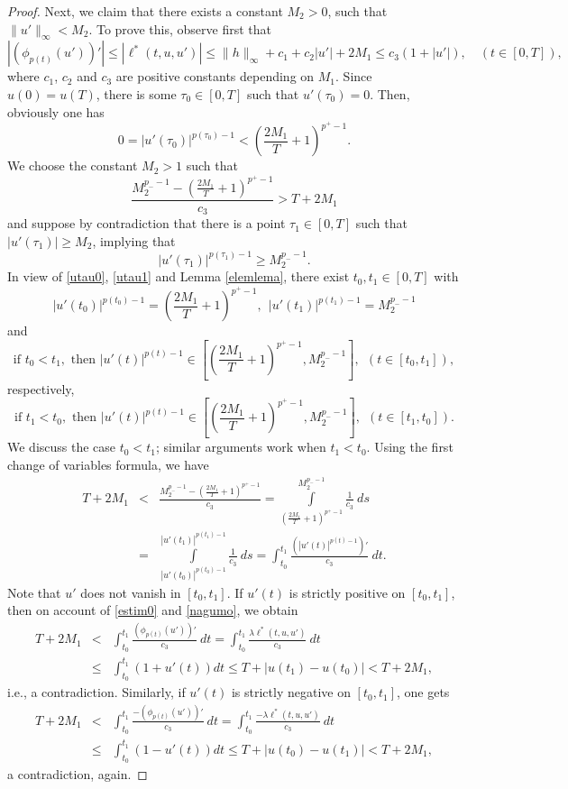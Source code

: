 \documentclass[10pt,a4paper]{amsart}
\begin{document}
\begin{proof}
Next, we claim that there exists a constant $M_2>0$, such that $\|u'\|_\infty<M_2$. To prove this, observe first that
\begin{equation}\label{nagumo}
    |(\phi_{p(t)}(u'))'|\leq|\ell^*(t,u,u')|\leq\|h\|_{\infty}+c_1+c_2|u'|+2M_1\leq c_3(1+|u'|),\quad (t\in[0,T]),
\end{equation}
where $c_1$, $c_2$ and $c_3$ are positive constants depending on $M_1$. Since $u(0)=u(T)$, there is some $\tau_0\in[0,T]$ such that $u'(\tau_0)=0$. Then, obviously one has
\begin{equation}\label{utau0}
    0=|u'(\tau_0)|^{p(\tau_0)-1}<\left(\frac{2M_1}{T}+1\right)^{p^+-1}.
\end{equation}
\noindent We choose the constant $M_2>1$ such that $$\frac{M_2^{p_--1}-\left(\displaystyle\frac{2M_1}{T}+1\right)^{p^+-1}}{c_3}>T+2M_1$$
and suppose by contradiction that there is a point $\tau_1\in [0,T]$ such that $|u'(\tau_1)|\geq M_2$, implying that
\begin{equation}\label{utau1}
    |u'(\tau_1)|^{p(\tau_1)-1}\geq M_2^{p_--1}.
\end{equation}
In view of \eqref{utau0}, \eqref{utau1} and Lemma \ref{elemlema}, there exist $t_0,t_1\in[0,T]$ with $$|u'(t_0)|^{p(t_0)-1}=\left(\displaystyle\frac{2M_1}{T}+1\right)^{p^+-1},\ \ |u'(t_1)|^{p(t_1)-1}=M_2^{p_--1}$$ and
$$\mbox{if } t_0<t_1, \mbox{ then } |u'(t)|^{p(t)-1}\in\left[\left(\displaystyle\frac{2M_1}{T}+1\right)^{p^+-1},M_2^{p_--1}\right],\ \ (t\in[t_0,t_1]),$$
respectively,
$$\mbox{if } t_1<t_0, \mbox{ then } |u'(t)|^{p(t)-1}\in\left[\left(\displaystyle\frac{2M_1}{T}+1\right)^{p^+-1},M_2^{p_--1}\right],\ \  (t\in[t_1,t_0]).$$
We discuss the case $t_0<t_1$; similar arguments work when $t_1<t_0$. Using the first change of variables formula, we have
\begin{eqnarray}\label{estim0}
  T+2M_1 &<& \frac{M_2^{p_--1}-\left(\displaystyle\frac{2M_1}{T}+1\right)^{p^+-1}}{c_3} =\int\limits_{\left(\frac{2M_1}{T}+1\right)^{p^+-1}}^{M_2^{p_--1}}\frac{1}{c_3}\ ds\nonumber\\
  &=& \int\limits_{|u'(t_0)|^{p(t_0)-1}}^{|u'(t_1)|^{p(t_1)-1}}\frac{1}{c_3}\ ds=\int_{t_0}^{t_1}\frac{(|u'(t)|^{p(t)-1})'}{c_3}\ dt.
\end{eqnarray}
Note that $u'$ does not vanish in $[t_0,t_1]$. If $u'(t)$ is strictly positive on $[t_0,t_1]$, then on account of \eqref{estim0} and \eqref{nagumo}, we obtain
\begin{eqnarray*}
  T+2M_1 &<& \int_{t_0}^{t_1}\frac{(\phi_{p(t)}(u'))'}{c_3}\ dt=\int_{t_0}^{t_1}\frac{\lambda\ell^*(t,u,u')}{c_3}\ dt \\
  &\leq& \int_{t_0}^{t_1}(1+u'(t)) dt\leq T+|u(t_1)-u(t_0)|<T+2M_1,
\end{eqnarray*}
i.e., a contradiction. Similarly, if $u'(t)$ is strictly negative on $[t_0,t_1]$, one gets
\begin{eqnarray*}
  T+2M_1 &<& \int_{t_0}^{t_1}\frac{-(\phi_{p(t)}(u'))'}{c_3}\ dt=\int_{t_0}^{t_1}\frac{-\lambda\ell^*(t,u,u')}{c_3}\ dt \\
  &\leq& \int_{t_0}^{t_1}(1-u'(t)) dt\leq T+|u(t_0)-u(t_1)|<T+2M_1,
\end{eqnarray*}
 a contradiction, again.
\smallskip


\end{proof}
\end{document}
